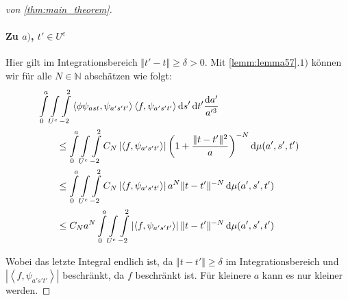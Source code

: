 \begin{proof}[von \ref{thm:main_theorem}]
\paragraph*{Zu $a)$, $t' \in U^c$}
Hier gilt im Integrationsbereich $\Vert t' - t \Vert \geq \delta > 0$. Mit \cref{lemm:lemma57}$.1)$ können wir für alle $N\in \mathbb{N}$ abschätzen wie folgt:
\begin{align*}
 &\kern-2em
 \int\limits_{0}^{a} \int\limits_{U^c} \int\limits_{-2}^2
 \left\langle \phi \psi_{ast}, \psi_{a's't'} \right\rangle
 \left\langle f, \psi_{a's't'} \right\rangle
    \d s' \d t' \frac{\d a'}{a^{\prime 3}}
\\&\leq
\int\limits_{0}^{a} \int\limits_{U^c} \int\limits_{-2}^2
C_N
\left| \left\langle f, \psi_{a's't'} \right\rangle \right|
\left(1+\frac{\Vert t-t' \Vert^2}{a}\right)^{-N} \d \mu(a',s',t')
\\&\leq
\int\limits_{0}^{a} \int\limits_{U^c} \int\limits_{-2}^2
C_N
\left| \left\langle f, \psi_{a's't'} \right\rangle \right|
a^N \Vert t-t' \Vert^{-N} \d \mu(a',s',t')
\\&\leq
C_N a^N
\int\limits_{0}^{a} \int\limits_{U^c} \int\limits_{-2}^2
\left| \left\langle f, \psi_{a's't'} \right\rangle \right|
\Vert t-t' \Vert^{-N} \d \mu(a',s',t')
\end{align*}

Wobei das letzte Integral endlich ist, da $\Vert t-t'\Vert \geq \delta$ im Integrationsbereich und $\left| \left\langle f, \psi_{a's't'} \right\rangle \right|$ beschränkt, da $f$ beschränkt ist. Für kleinere $a$ kann es nur kleiner werden.



\end{proof}
